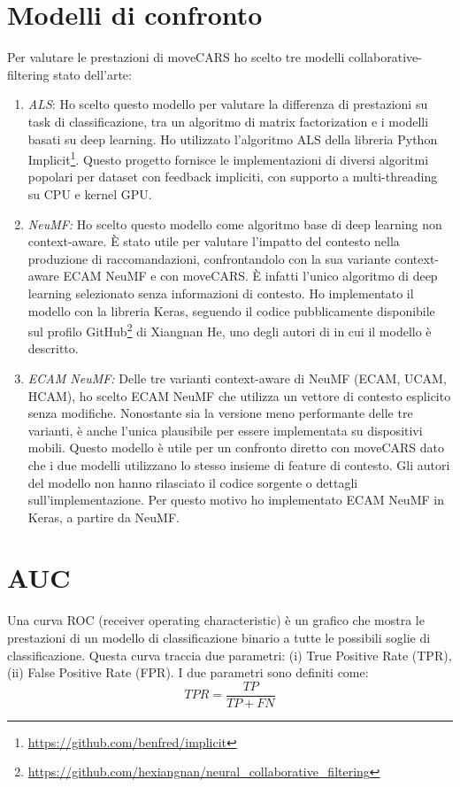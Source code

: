 \documentclass[12pt,italian]{report}
\begin{document}
\section{Modelli di confronto} \label{sec:comp-model}
Per valutare le prestazioni di moveCARS ho scelto tre modelli collaborative-filtering stato dell'arte:
\begin{enumerate}
\item \textit{ALS}: Ho scelto questo modello per valutare la differenza di prestazioni su task di classificazione, tra un algoritmo di matrix factorization
e i modelli basati su deep learning. Ho utilizzato l'algoritmo ALS della libreria Python Implicit\footnote{\url{https://github.com/benfred/implicit}}. Questo progetto fornisce le implementazioni di diversi algoritmi popolari per dataset con feedback impliciti, con supporto a multi-threading su CPU e kernel GPU. 
\item \textit{NeuMF:} Ho scelto questo modello come algoritmo base di deep learning non context-aware. \`E stato utile 
per valutare l'impatto del contesto nella produzione di raccomandazioni, confrontandolo con la sua variante context-aware ECAM NeuMF e con moveCARS. \`E infatti l'unico algoritmo di deep learning selezionato senza informazioni di contesto. Ho implementato il modello con la libreria Keras, seguendo il codice pubblicamente disponibile sul profilo GitHub\footnote{\url{https://github.com/hexiangnan/neural_collaborative_filtering}} di Xiangnan He, uno degli autori di \cite{NCF} in cui il modello è descritto.
\item \textit{ECAM NeuMF:} Delle tre varianti context-aware di NeuMF (ECAM, UCAM, HCAM), ho scelto ECAM NeuMF che utilizza un vettore di contesto esplicito senza modifiche. Nonostante sia la versione meno performante delle tre varianti, è anche l'unica plausibile per essere implementata su dispositivi mobili. Questo modello è utile per un confronto diretto con moveCARS dato che i due modelli utilizzano lo stesso insieme di feature di contesto. Gli autori del modello non hanno rilasciato il codice sorgente o dettagli sull'implementazione. Per questo motivo ho implementato ECAM NeuMF in Keras, a partire da NeuMF.
\end{enumerate}

\section{AUC}
Una curva ROC (receiver operating characteristic) è un grafico che mostra le prestazioni di un modello di classificazione binario a tutte le possibili soglie di classificazione. Questa curva traccia due parametri: (i) True Positive Rate (TPR), (ii) False Positive Rate (FPR). I due parametri sono definiti come:
$$
TPR = \frac{TP}{TP+FN}
$$
\end{document}
